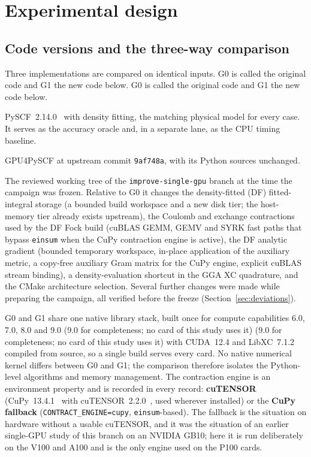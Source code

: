 \section{Experimental design}
\label{sec:methods}

\subsection{Code versions and the three-way comparison}

Three implementations are compared on identical inputs. G0 is called the original code and G1 the new code below. G0 is called the original code and G1 the new code below.

\begin{description}[leftmargin=1.2cm,style=nextline]
\item[\textbf{CPU}] PySCF~2.14.0~\cite{sun2018pyscf,sun2020pyscf} with density fitting, the matching physical model for every case. It serves as the accuracy oracle and, in a separate lane, as the CPU timing baseline.
\item[\textbf{G0 (original GPU)}] GPU4PySCF at upstream commit \texttt{9af748a}, with its Python sources unchanged.
\item[\textbf{G1 (new GPU)}] The reviewed working tree of the \texttt{improve-single-gpu} branch at the time the campaign was frozen. Relative to G0 it changes the density-fitted (DF) fitted-integral storage (a bounded build workspace and a new disk tier; the host-memory tier already exists upstream), the Coulomb and exchange contractions used by the DF Fock build (cuBLAS GEMM, GEMV and SYRK fast paths that bypass \texttt{einsum} when the CuPy contraction engine is active), the DF analytic gradient (bounded temporary workspace, in-place application of the auxiliary metric, a copy-free auxiliary Gram matrix for the CuPy engine, explicit cuBLAS stream binding), a density-evaluation shortcut in the GGA XC quadrature, and the CMake architecture selection. Several further changes were made while preparing the campaign, all verified before the freeze (Section~\ref{sec:deviations}).
\end{description}

G0 and G1 share one native library stack, built once for compute capabilities 6.0, 7.0, 8.0 and 9.0 (9.0 for completeness; no card of this study uses it) (9.0 for completeness; no card of this study uses it) with CUDA~12.4 and LibXC~7.1.2~\cite{lehtola2018libxc} compiled from source, so a single build serves every card. No native numerical kernel differs between G0 and G1; the comparison therefore isolates the Python-level algorithms and memory management. The contraction engine is an environment property and is recorded in every record: \textbf{cuTENSOR} (CuPy~13.4.1~\cite{okuta2017cupy} with cuTENSOR~2.2.0~\cite{cutensor}, used wherever installed) or the \textbf{CuPy fallback} (\texttt{CONTRACT\_ENGINE=cupy}, \texttt{einsum}-based). The fallback is the situation on hardware without a usable cuTENSOR, and it was the situation of an earlier single-GPU study of this branch on an NVIDIA GB10; here it is run deliberately on the V100 and A100 and is the only engine used on the P100 cards.

